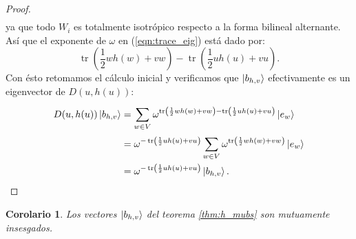 \documentclass[a4paper,11pt]{report}
\DeclareMathOperator{\tr}{tr}
\newtheorem{corollary}{Corolario}
\begin{document}
\begin{proof}
\begin{align}
    \end{align}
    ya que todo $W_i$ es totalmente isotrópico respecto a la
    forma bilineal alternante. Así que el exponente de
    $\omega$ en (\ref{eqn:trace_eig}) está dado por: 
    \begin{equation}
      \tr\left( \frac{1}{2} w h(w) + v w \right)
      - \tr\left( \frac{1}{2} u h(u) + v u \right).
    \end{equation}
    Con ésto retomamos el cálculo inicial y verificamos que
    $\ket{b_{h,v}}$ efectivamente es un eigenvector de
    $D(u,h(u))$:
    \begin{align}
      D(u,h(u)) \ket{b_{h,v}}
      &= \sum_{w \in V}^{}
      \omega^{\tr\left(
          \frac{1}{2} w h(w) + v w
      \right)
      - \tr\left(
        \frac{1}{2} u h(u) + v u
      \right) } \ket{e_w} \\
      &= \omega^{-\tr\left(
          \frac{1}{2} u h(u) + v u
      \right) }
      \sum_{w \in V}^{}
      \omega^{\tr\left(
        \frac{1}{2} w h(w) + v w
      \right) } \ket{e_w} \\
      &= \omega^{-\tr\left(
        \frac{1}{2} u h(u) + v u
      \right) } \ket{b_{h,v}}.
    \end{align}
  \end{proof}
  \begin{corollary}
    Los vectores $\ket{b_{h,v}}$ del teorema
    \ref{thm:h_mubs} son mutuamente insesgados.
  \end{corollary}
\end{document}

